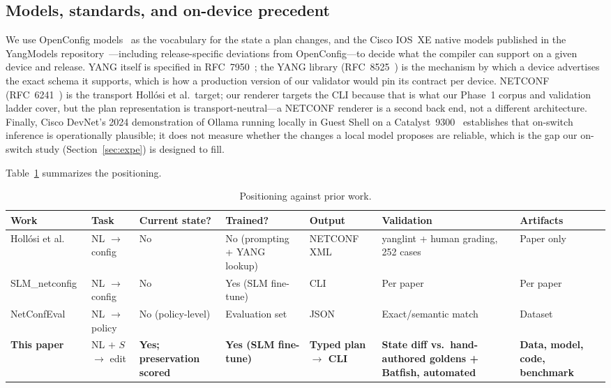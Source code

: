\documentclass[conference]{IEEEtran}
\begin{document}
\subsection{Models, standards, and on-device precedent}

We use OpenConfig models~\cite{openconfigpublic} as the vocabulary for the state a plan changes, and the Cisco IOS~XE native models published in the YangModels repository~\cite{yangmodels}---including release-specific deviations from OpenConfig---to decide what the compiler can support on a given device and release. YANG itself is specified in RFC~7950~\cite{rfc7950}; the YANG library (RFC~8525~\cite{rfc8525}) is the mechanism by which a device advertises the exact schema it supports, which is how a production version of our validator would pin its contract per device. NETCONF (RFC~6241~\cite{rfc6241}) is the transport Holl\'osi et al.\ target; our renderer targets the CLI because that is what our Phase~1 corpus and validation ladder cover, but the plan representation is transport-neutral---a NETCONF renderer is a second back end, not a different architecture. Finally, Cisco DevNet's 2024 demonstration of Ollama running locally in Guest Shell on a Catalyst~9300~\cite{devnetguestshell2024} establishes that on-switch inference is operationally plausible; it does not measure whether the changes a local model proposes are reliable, which is the gap our on-switch study (Section~\ref{sec:expe}) is designed to fill.

Table~\ref{tab:positioning} summarizes the positioning.

\begin{table}[t]
\centering
\caption{Positioning against prior work.}
\label{tab:positioning}
\small
\begin{tabular}{@{}p{2.6cm}p{2.2cm}p{1.9cm}p{1.8cm}p{2.0cm}p{3.4cm}p{1.9cm}@{}}
\toprule
\textbf{Work} & \textbf{Task} & \textbf{Current state?} & \textbf{Trained?} & \textbf{Output} & \textbf{Validation} & \textbf{Artifacts} \\
\midrule
Holl\'osi et al.~\cite{hollosi2024netconf} & NL $\rightarrow$ config & No & No (prompting + YANG lookup) & NETCONF XML & yanglint + human grading, 252 cases & Paper only \\
SLM\_netconfig~\cite{slmnetconfig2025} & NL $\rightarrow$ config & No & Yes (SLM fine-tune) & CLI & Per paper & Per paper \\
NetConfEval~\cite{netconfeval} & NL $\rightarrow$ policy & No (policy-level) & Evaluation set & JSON & Exact/semantic match & Dataset \\
\textbf{This paper} & NL $+$ $S$ $\rightarrow$ edit & \textbf{Yes; preservation scored} & \textbf{Yes (SLM fine-tune)} & \textbf{Typed plan $\rightarrow$ CLI} & \textbf{State diff vs.\ hand-authored goldens + Batfish, automated} & \textbf{Data, model, code, benchmark} \\
\bottomrule
\end{tabular}
\end{table}
\end{document}
